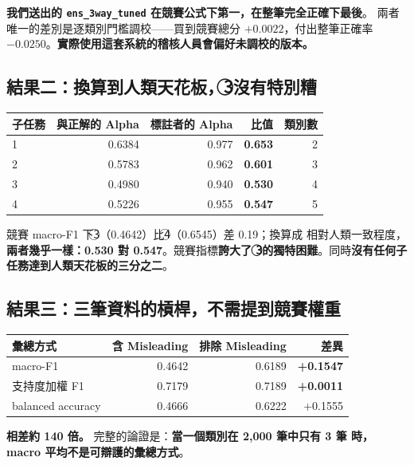 \documentclass[11pt,a4paper]{ctexart}
\newcommand{\fn}[1]{\texttt{#1}}
\begin{document}
\textbf{我們送出的 \fn{ens\_3way\_tuned} 在競賽公式下第一，在整筆完全正確下最後}。
兩者唯一的差別是逐類別門檻調校——買到競賽總分 $+0.0022$，付出整筆正確率
$\mathbf{-0.0250}$。\textbf{實際使用這套系統的稽核人員會偏好未調校的版本。}

\subsection{結果二：換算到人類天花板，\textcircled{3}沒有特別糟}

\begin{table}[h]
\centering\small
\begin{tabular}{@{}lrrrr@{}}
\toprule
子任務 & 與正解的 Alpha & 標註者的 Alpha & 比值 & 類別數 \\
\midrule
\textcircled{1} & 0.6384 & 0.977 & \textbf{0.653} & 2 \\
\textcircled{2} & 0.5783 & 0.962 & \textbf{0.601} & 3 \\
\textcircled{3} & 0.4980 & 0.940 & \textbf{0.530} & 4 \\
\textcircled{4} & 0.5226 & 0.955 & \textbf{0.547} & 5 \\
\bottomrule
\end{tabular}
\end{table}

競賽 macro-F1 下\textcircled{3}（0.4642）比\textcircled{4}（0.6545）差 0.19；換算成
相對人類一致程度，\textbf{兩者幾乎一樣：0.530 對 0.547}。競賽指標\textbf{誇大了
\textcircled{3}的獨特困難}。同時\textbf{沒有任何子任務達到人類天花板的三分之二}。

\subsection{結果三：三筆資料的槓桿，不需提到競賽權重}

\begin{table}[h]
\centering\small
\begin{tabular}{@{}lrrr@{}}
\toprule
彙總方式 & 含 Misleading & 排除 Misleading & 差異 \\
\midrule
macro-F1 & 0.4642 & 0.6189 & \textbf{+0.1547} \\
支持度加權 F1 & 0.7179 & 0.7189 & \textbf{+0.0011} \\
balanced accuracy & 0.4666 & 0.6222 & +0.1555 \\
\bottomrule
\end{tabular}
\end{table}

\textbf{相差約 140 倍。} 完整的論證是：\textbf{當一個類別在 2{,}000 筆中只有 3 筆
時，macro 平均不是可辯護的彙總方式}。
\end{document}
